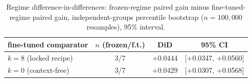 \begin{table}[t]
\centering
\caption{Regime difference-in-differences: frozen-regime paired gain minus fine-tuned-regime paired gain, independent-groups percentile bootstrap ($n{=}100,000$ resamples), 95\% interval.}
\label{tab:diff-in-diff}
\begin{tabular}{lccc}
\toprule
fine-tuned comparator & $n$ (frozen/f.t.) & DiD & 95\% CI \\
\midrule
$k=8$ (locked recipe) & 3/7 & +0.0444 & [+0.0347, +0.0560] \\
$k=0$ (context-free) & 3/7 & +0.0429 & [+0.0307, +0.0568] \\
\bottomrule
\end{tabular}
\end{table}
